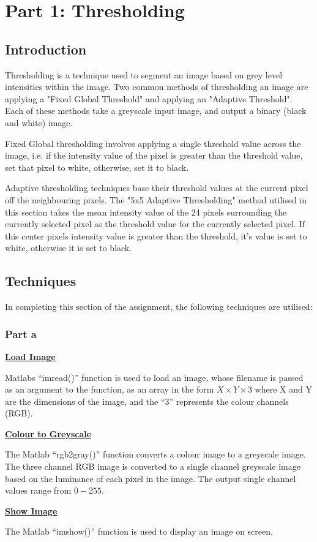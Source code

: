 \documentclass[a4paper]{article}
\begin{document}
	\section{Part 1: Thresholding}
	\subsection{Introduction}
	Thresholding is a technique used to segment an image based on grey level
	intensities within the image. Two common methods of thresholding an
	image are applying a "Fixed Global Threshold" and applying an "Adaptive
	Threshold". Each of these methods take a greyscale input image, and
	output a binary (black and white) image.
	\par Fixed Global thresholding involves applying a single threshold value
	across the image, i.e. if the intensity value of the pixel is greater
	than the threshold value, set that pixel to white, otherwise, set it to
	black.
	\par Adaptive thresholding techniques base their threshold values at the
	current pixel off the neighbouring pixels. The "5x5 Adaptive
	Thresholding" method utilised in this section takes the mean intensity
	value of the 24 pixels surrounding the currently selected pixel as the
	threshold value for the currently selected pixel. If this center pixels
	intensity value is greater than the threshold, it's value is set to
	white, otherwise it is set to black.
	\subsection{Techniques}
	In completing this section of the assignment, the following techniques
	are utilised:
	\subsubsection{Part a}
	\underline{\textbf{Load Image}}
	\par Matlabs ``imread()'' function is used to load an image, whose filename
	is passed as an argument to the function, as an array in the form
	$X \times Y \times 3$ where X and Y are the dimensions of the image, and
	the ``3'' represents the colour channels (RGB).
	\par \underline{\textbf{Colour to Greyscale}}
	\par The Matlab ``rgb2gray()'' function converts a colour image to a
	greyscale image. The three channel RGB image is converted to a single
	channel greyscale image based on the luminance of each pixel in the
	image. The output single channel values range from $0-255$.
	\par\underline{\textbf{Show Image}}
	\par The Matlab ``imshow()'' function is used to display an image on
	screen.
\end{document}
